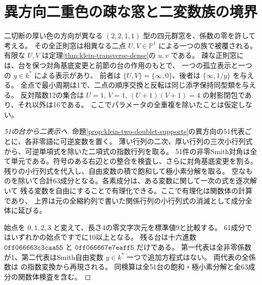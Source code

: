 \section{異方向二重色の疎な窓と二変数族の境界}
\label{sec:klein-sparse-transverse}
\begin{theorem}\label{thm:klein-sparse-transverse}
二切断の厚い色の方向が異なる $(2,2,1,1)$ 型の四元群窓を、係数の零を許して考える。
その全正則窓は相異なる二点 $U,V\in\mathbb P^1$ による一つの族で被覆される。
有限な $U,V$ は定理\ref{thm:klein-transverse-dense}の $u,v$ である。
疎な正則窓には、台を保つ対角基底変更と前節の台の作用のもとで、
一つの孤立表示と一つの $y\in k^*$ による表示があり、
前者は $\{U,V\}=\{\infty,0\}$、後者は $\{\infty,1/y\}$ を与える。
全点で最小周期は1で、二点の順序交換と反転は同じ添字保持同型類を与える。
反対階数12の集合は $U=1$, $V=1$, $(U+1)(V+1)=4$ の射影閉包であり、それ以外は16である。
ここでパラメータの全重複を除いたことは仮定しない。
\end{theorem}
\begin{proof}[51の台から二表示へ]
命題\ref{prop:klein-two-doublet-supports}の異方向の51代表ごとに、各非零語に可逆変数を置く。
薄い行列の二次、厚い行列の三次小行列式から、可逆単項式を除いた二項式の指数行列を取る。
51件の非零Smith対角は全て単元である。符号のある右辺との整合を検査し、さらに対角基底変更を割る。
残りの小行列式を代入し、自由変数の積で飽和して極小素分解を取る。
空なものを除いて合計63成分となる。各素成分は、ある変数に関して一次の式を逐次解いて
残る変数を自由にすることで有理化できる。ここで有理化は関数体の計算であり、
上界は元の全縮約列で書いた関係行列の小行列式の消滅として成分全体に延びる。

始点を $0,1,2,3$ と変えて、長さ4の零文字次元を標準値9と比較する。
61成分ではいずれかの始点ですでに10以上となる。
残る台は十六進数 $\mathtt{0ff066663c3caa55}$ と $\mathtt{0ff066667e7eaff5}$ だけである。
第一代表は全非零係数が1、第二代表はSmith自由変数 $y\in k^*$ 一つで追加方程式はない。
両代表の全係数は  の指数変換から再現される。
同検算は全51台の飽和・極小素分解と全63成分の関数体検査を含む。
\end{proof}

